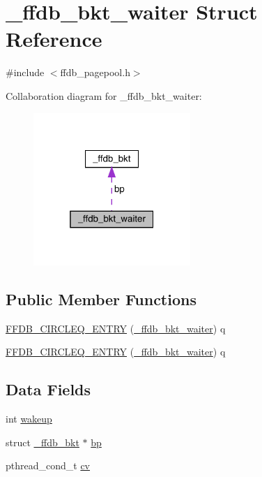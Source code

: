 \hypertarget{struct__ffdb__bkt__waiter}{}\section{\+\_\+ffdb\+\_\+bkt\+\_\+waiter Struct Reference}
\label{struct__ffdb__bkt__waiter}


{\ttfamily \#include $<$ffdb\+\_\+pagepool.\+h$>$}



Collaboration diagram for \+\_\+ffdb\+\_\+bkt\+\_\+waiter\+:\nopagebreak
\begin{figure}[H]
\begin{center}
\leavevmode
\includegraphics[width=169pt]{d6/d97/struct__ffdb__bkt__waiter__coll__graph}
\end{center}
\end{figure}
\subsection*{Public Member Functions}
\begin{DoxyCompactItemize}
\item 
\mbox{\hyperlink{struct__ffdb__bkt__waiter_a46ff621e44918a826d983ac183c59c5c}{F\+F\+D\+B\+\_\+\+C\+I\+R\+C\+L\+E\+Q\+\_\+\+E\+N\+T\+RY}} (\mbox{\hyperlink{struct__ffdb__bkt__waiter}{\+\_\+ffdb\+\_\+bkt\+\_\+waiter}}) q
\item 
\mbox{\hyperlink{struct__ffdb__bkt__waiter_a46ff621e44918a826d983ac183c59c5c}{F\+F\+D\+B\+\_\+\+C\+I\+R\+C\+L\+E\+Q\+\_\+\+E\+N\+T\+RY}} (\mbox{\hyperlink{struct__ffdb__bkt__waiter}{\+\_\+ffdb\+\_\+bkt\+\_\+waiter}}) q
\end{DoxyCompactItemize}
\subsection*{Data Fields}
\begin{DoxyCompactItemize}
\item 
int \mbox{\hyperlink{struct__ffdb__bkt__waiter_a9677f7593396ca503610bd92c4430835}{wakeup}}
\item 
struct \mbox{\hyperlink{struct__ffdb__bkt}{\+\_\+ffdb\+\_\+bkt}} $\ast$ \mbox{\hyperlink{struct__ffdb__bkt__waiter_ad0a79a0bbf4f48827956b35c98b14b23}{bp}}
\item 
pthread\+\_\+cond\+\_\+t \mbox{\hyperlink{struct__ffdb__bkt__waiter_a508c044094f22ad3c61725a3719147f3}{cv}}
\end{DoxyCompactItemize}


